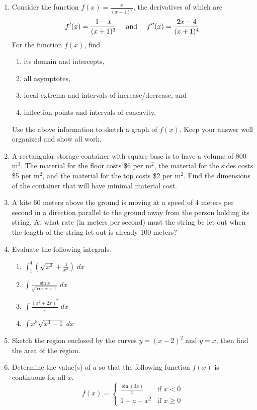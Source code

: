 \documentclass[12pt,legalpaper]{article}
\newcommand{\ds}{\displaystyle}
\begin{document}
\begin{enumerate}
\newpage
\item Consider
  the function $\ds f(x) = \frac{x}{(x+1)^2}$, the derivatives of which
  are 
  \begin{equation*}
    \mbox{$\ds f'(x) = \frac{1-x}{(x+1)^3}$ \quad and \quad
      $\ds f''(x) = \frac{2x-4}{(x+1)^4}$}
  \end{equation*}
  For the function $f(x)$, find 
  \begin{enumerate}
  \item its domain and intercepts,
  \item all asymptotes,
  \item local extrema and intervals of increase/decrease, and 
  \item inflection points and intervals of concavity.  
  \end{enumerate}
  Use the above information to sketch a graph of $f(x)$.  Keep your
  answer well organized and show all work.
\vfill
\newpage
\item A 
  rectangular storage container with square base is to have a volume of
  800 m$^3$.  The material for the floor costs \$6 per m$^2$, the material
  for the sides costs \$5 per m$^2$, and the material for the top costs
  \$2 per m$^2$.  Find the dimensions of the container that will have minimal
  material cost.
\vfill
\item A 
  kite 60 meters above the ground is moving at a speed of 4 meters per second
  in a direction parallel to the ground away from the person holding its
  string.  At what rate (in meters per second) must the string be let out
  when the length of the string let out is already 100 meters?
\vfill
\newpage
\item Evaluate
  the following integrals.
  \begin{enumerate}
  \item $\ds \int_1^4 \left(\sqrt{x^3}+\frac{4}{x^2}\right) \; dx$
\vfill
  \item $\ds \int\frac{\sin x}{\sqrt{\cos x + 1}}\; dx$
\vfill
  \item $\ds \int\frac{(x^2+2x)^2}{x} \; dx$
\vfill
  \item $\ds \int x^5 \sqrt{x^3-1} \; dx$
\vfill
  \end{enumerate}
\newpage
\item Sketch 
  the region enclosed by the curves $\ds y=(x-2)^2$ and $y=x$, then
  find the area of the region.
\vfill
\newpage
\item Determine 
  the value(s) of $a$ so that the following function $f(x)$ is
  continuous for all $x$.
  \begin{equation*}
    f(x) = \begin{cases}
      \ds \frac{\sin(3x)}{x} & \mbox{if $x<0$} \\
      \ds 1-a-x^2            & \mbox{if $x\ge 0$}
    \end{cases}
  \end{equation*}
\end{enumerate}
\end{document}
